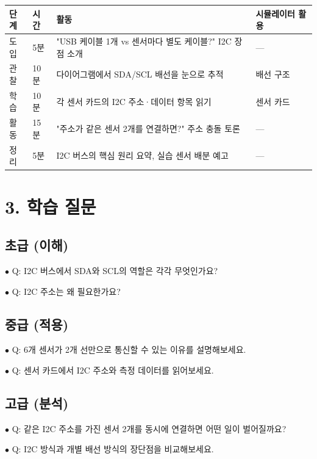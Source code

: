 \documentclass[11pt,a4paper]{article}
\begin{document}
\begin{center}
\renewcommand{\arraystretch}{1.4}
\begin{tabular}{|p{1.5cm}|p{1.5cm}|p{9.1cm}|p{2.9cm}|}
\hline
\rowcolor{tableheader}
\textbf{단계} & \textbf{시간} & \textbf{활동} & \textbf{시뮬레이터 활용} \\
\hline
도입 & 5분 & "USB 케이블 1개 vs 센서마다 별도 케이블?" I2C 장점 소개 & — \\
\hline
관찰 & 10분 & 다이어그램에서 SDA/SCL 배선을 눈으로 추적 & 배선 구조 \\
\hline
학습 & 10분 & 각 센서 카드의 I2C 주소·데이터 항목 읽기 & 센서 카드 \\
\hline
활동 & 15분 & "주소가 같은 센서 2개를 연결하면?" 주소 충돌 토론 & — \\
\hline
정리 & 5분 & I2C 버스의 핵심 원리 요약, 실습 센서 배분 예고 & — \\
\hline
\end{tabular}
\end{center}


\section*{3. 학습 질문}

\subsection*{초급 (이해)}

$\bullet$ Q: I2C 버스에서 SDA와 SCL의 역할은 각각 무엇인가요?

$\bullet$ Q: I2C 주소는 왜 필요한가요?


\subsection*{중급 (적용)}

$\bullet$ Q: 6개 센서가 2개 선만으로 통신할 수 있는 이유를 설명해보세요.

$\bullet$ Q: 센서 카드에서 I2C 주소와 측정 데이터를 읽어보세요.


\subsection*{고급 (분석)}

$\bullet$ Q: 같은 I2C 주소를 가진 센서 2개를 동시에 연결하면 어떤 일이 벌어질까요?

$\bullet$ Q: I2C 방식과 개별 배선 방식의 장단점을 비교해보세요.
\end{document}
